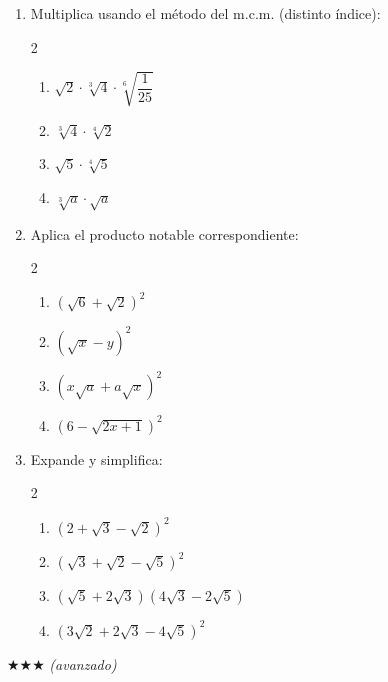 \documentclass[11pt, letterpaper]{article}
\begin{document}
\begin{enumerate}[label=\textbf{\arabic*.}, leftmargin=*, resume]
  \item Multiplica usando el método del m.c.m. (distinto índice):
  \begin{multicols}{2}
  \begin{enumerate}[label=\alph*)]
    \item $\sqrt{2}\cdot\sqrt[3]{4}\cdot\sqrt[6]{\dfrac{1}{25}}$
    \item $\sqrt[3]{4}\cdot\sqrt[4]{2}$
    \item $\sqrt{5}\cdot\sqrt[4]{5}$
    \item $\sqrt[3]{a}\cdot\sqrt{a}$
  \end{enumerate}
  \end{multicols}

  \item Aplica el producto notable correspondiente:
  \begin{multicols}{2}
  \begin{enumerate}[label=\alph*)]
    \item $(\sqrt{6}+\sqrt{2})^2$
    \item $(\sqrt{x}-y)^2$
    \item $(x\sqrt{a}+a\sqrt{x})^2$
    \item $(6-\sqrt{2x+1})^2$
  \end{enumerate}
  \end{multicols}

  \item Expande y simplifica:
  \begin{multicols}{2}
  \begin{enumerate}[label=\alph*)]
    \item $(2+\sqrt{3}-\sqrt{2})^2$
    \item $(\sqrt{3}+\sqrt{2}-\sqrt{5})^2$
    \item $(\sqrt{5}+2\sqrt{3})(4\sqrt{3}-2\sqrt{5})$
    \item $(3\sqrt{2}+2\sqrt{3}-4\sqrt{5})^2$
  \end{enumerate}
  \end{multicols}
\end{enumerate}

$\bigstar\bigstar\bigstar$ \textit{(avanzado)}
\end{document}
